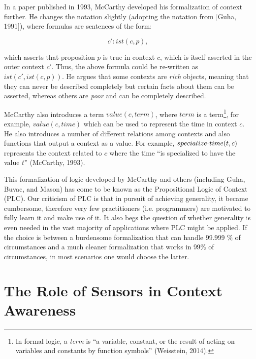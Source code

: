 In a paper published in 1993, McCarthy developed his formalization of context further. He changes the notation slightly (adopting the notation from [Guha, 1991]), where formulas are sentences of the form:

\begin{equation}
  \label{eq:newton2}
 c': 		ist(c,p),
\end{equation}

which asserts that proposition $p$ is true in context $c$, which is itself asserted in the outer context $c'$. Thus, the above formula could be re-written as $ist(c', ist(c,p))$. He argues that some contexts are \emph{rich} objects, meaning that they can never be described completely but certain facts about them can be asserted, whereas others are \emph{poor} and can be completely described.

McCarthy also introduces a term $value(c,term)$, where $term$ is a term\footnote{In formal logic, a \emph{term} is ``a variable, constant, or the result of acting on variables and constants by function symbols'' (Weisstein, 2014).}, for example, $value(c,time)$ which can be used to represent the time in context $c$. He also introduces a number of different relations among contexts and also functions that output a context as a value. For example, $specialize\textnormal{-}time(t, c)$ represents the context related to $c$ where the time ``is specialized to have the value $t$'' (McCarthy, 1993).

This formalization of logic developed by McCarthy and others (including Guha, Buvac, and Mason) has come to be known as the Propositional Logic of Context (PLC). Our criticism of PLC is that in pursuit of achieving generality, it became cumbersome, therefore very few practitioners (i.e. programmers) are motivated to fully learn it and make use of it. It also begs the question of whether generality is even needed in the vast majority of applications where PLC might be applied. If the choice is between a burdensome formalization that can handle 99.999 \% of circumstances and a much cleaner formalization that works in 99\% of circumstances, in most scenarios one would choose the latter.




\section{The Role of Sensors in Context Awareness}

